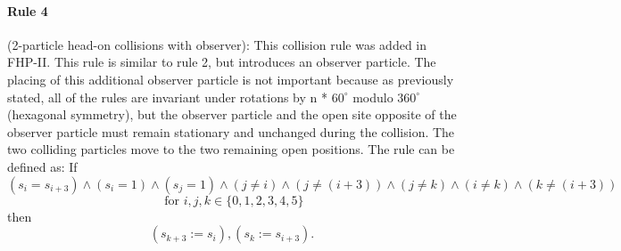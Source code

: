 \documentclass[a4paper,12pt]{article}
\begin{document}
\paragraph{Rule 4}(2-particle head-on collisions with observer):
This collision rule was added in FHP-II. This rule is similar to rule 2, but introduces
an observer particle. The placing of this additional observer particle is not important because as previously stated,
all of the rules are invariant under rotations by n * $60^{\circ}$ modulo $360^{\circ}$(hexagonal symmetry), but the observer particle and the open site opposite of the observer particle must remain stationary and unchanged during the collision. The two colliding particles move to the two remaining open positions. The rule can be defined as: If \[(s_{i} = s_{i + 3})\wedge(s_{i} = 1)\wedge(s_{j} = 1)\wedge(j \neq i)\wedge(j \neq (i + 3))\wedge(j \neq k)\wedge(i \neq k)\wedge(k \neq (i + 3))\]\[\mbox{ for } i,j,k \in \{0, 1, 2, 3, 4, 5\}\] then 
\[ (s_{k + 3} := s_{i}), (s_{k} := s_{i + 3}).\]
\end{document}
